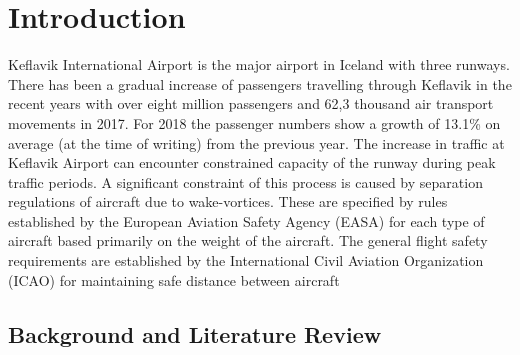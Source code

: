 \chapter{Introduction\label{cha:introduction}}

Keflavik International Airport is the major airport in Iceland with three runways. There has been a gradual increase of passengers travelling through Keflavik in the recent years with over eight million passengers and 62,3 thousand air transport movements in 2017\cite{isavia_facts_2017}. For 2018 the passenger numbers show a growth of 13.1\% on average (at the time of writing) from the previous year\cite{isavia_pass_statistics_2018}. The increase in traffic at Keflavik Airport can encounter constrained capacity of the runway during peak traffic periods. 
A significant constraint of this process is caused by separation regulations of aircraft due to wake-vortices. These are specified by rules established by the European Aviation Safety Agency (EASA)  for each type of aircraft based primarily on the weight of the aircraft. The general flight safety requirements are established by the International Civil Aviation Organization (ICAO) for maintaining safe distance between aircraft

\section{Background and Literature Review}

